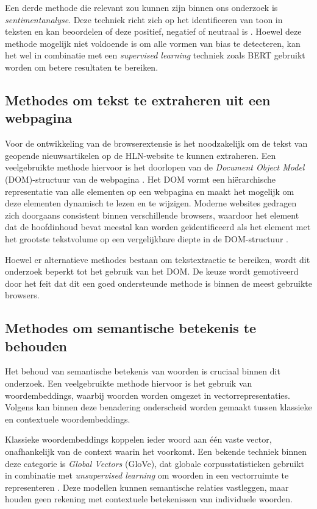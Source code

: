 Een derde methode die relevant zou kunnen zijn binnen ons onderzoek is \textit{sentimentanalyse}. Deze techniek richt zich op het identificeren van toon in teksten en kan beoordelen of deze positief, negatief of neutraal is \autocite{Cui2025}. Hoewel deze methode mogelijk niet voldoende is om alle vormen van bias te detecteren, kan het wel in combinatie met een \textit{supervised learning} techniek zoals BERT gebruikt worden om betere resultaten te bereiken.

\subsection{Methodes om tekst te extraheren uit een webpagina}

Voor de ontwikkeling van de browserextensie is het noodzakelijk om de tekst van geopende nieuwsartikelen op de HLN-website te kunnen extraheren. Een veelgebruikte methode hiervoor is het doorlopen van de \textit{Document Object Model} (DOM)-structuur van de webpagina \autocite{GCD2012}. Het DOM vormt een hiërarchische representatie van alle elementen op een webpagina en maakt het mogelijk om deze elementen dynamisch te lezen en te wijzigen. Moderne websites gedragen zich doorgaans consistent binnen verschillende browsers, waardoor het element dat de hoofdinhoud bevat meestal kan worden geïdentificeerd als het element met het grootste tekstvolume op een vergelijkbare diepte in de DOM-structuur \autocite{Aleksandersen2018}.

Hoewel er alternatieve methodes bestaan om tekstextractie te bereiken, wordt dit onderzoek beperkt tot het gebruik van het DOM. De keuze wordt gemotiveerd door het feit dat dit een goed ondersteunde methode is binnen de meest gebruikte browsers.

\subsection{Methodes om semantische betekenis te behouden}

Het behoud van semantische betekenis van woorden is cruciaal binnen dit onderzoek. Een veelgebruikte methode hiervoor is het gebruik van woordembeddings, waarbij woorden worden omgezet in vectorrepresentaties. Volgens \textcite{Akbik2018} kan binnen deze benadering onderscheid worden gemaakt tussen klassieke en contextuele woordembeddings.

Klassieke woordembeddings koppelen ieder woord aan één vaste vector, onafhankelijk van de context waarin het voorkomt. Een bekende techniek binnen deze categorie is \textit{Global Vectors} (GloVe), dat globale corpusstatistieken gebruikt in combinatie met \textit{unsupervised learning} om woorden in een vectorruimte te representeren \autocite{Pennington2014}. Deze modellen kunnen semantische relaties vastleggen, maar houden geen rekening met contextuele betekenissen van individuele woorden.

